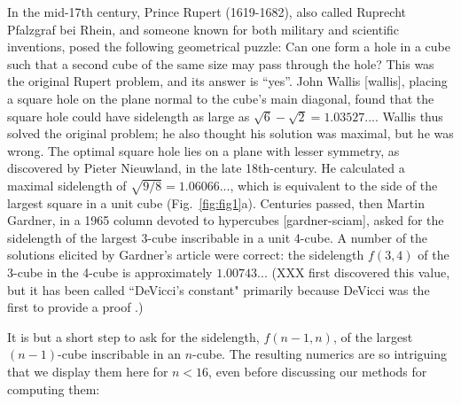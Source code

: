 \documentclass[superscriptaddress,reprint,amsmath,amssymb,aps]{revtex4-1}
\begin{document}
\vspace{.15in}

In the mid-17th century, Prince Rupert (1619-1682), also called Ruprecht Pfalzgraf bei Rhein, and someone known for both military and scientific inventions, posed the following geometrical puzzle: Can one form a hole in a cube such that a second cube of the same size may pass through the hole?
This was the original Rupert problem, and its answer is ``yes''.  John Wallis [wallis], placing a square hole on the plane normal to the cube's main diagonal, found that the square hole could have sidelength as large as $\sqrt{6}-\sqrt{2}=1.03527...$.  Wallis thus solved the original problem; he also thought his solution was maximal, but he was wrong.  The optimal square hole lies on a plane with lesser symmetry, as discovered by Pieter Nieuwland, in the late 18th-century.  He calculated a maximal sidelength of $\sqrt{9/8} = 1.06066...$, which is equivalent to the side of the largest square in a unit cube (Fig.~\ref{fig:fig1}a). Centuries passed, then Martin Gardner, in a 1965 column devoted to hypercubes [gardner-sciam], asked for the sidelength of the largest 3-cube inscribable in a unit 4-cube. A number of the solutions elicited by Gardner's article were correct: the sidelength $f(3,4)$ of the 3-cube in the 4-cube is approximately $1.00743...$ (XXX first discovered this value, but it has been called ``DeVicci's constant" \cite{finch} primarily because DeVicci was the first to provide a proof \cite{devicci-shultz}.)

It is but a short step to ask for the sidelength, $f(n-1,n)$, of the largest $(n-1)$-cube inscribable in an $n$-cube.  The resulting numerics are so intriguing that we display them here for $n<16$, even before discussing our methods for computing them:
\end{document}
